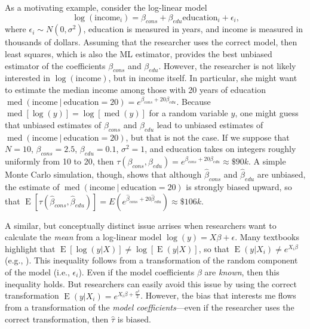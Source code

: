 \documentclass[12pt]{article}
\DeclareMathOperator{\med}{med}
\DeclareMathOperator*{\E}{\text{E}}
\begin{document}
As a motivating example, consider the log-linear model 
\begin{equation}
\log (\text{income}_i) = \beta_{cons} + \beta_{edu} \text{education}_i + \epsilon_i \text{,}\nonumber
\end{equation}
where $\epsilon_i \sim N(0, \sigma^2)$, education is measured in years, and income is measured in thousands of dollars. 
Assuming that the researcher uses the correct model, then least squares, which is also the ML estimator, provides the best unbiased estimator of the coefficients $\beta_{cons}$ and $\beta_{edu}$. 
However, the researcher is not likely interested in $\log(\text{income})$, but in income itself. 
In particular, she might want to estimate the median income among those with 20 years of education $\med(\text{income} ~|~ \text{education} = 20) = e^{\beta_{cons} + 20\beta_{edu}}$. 
Because $\med[\log(y)] = \log[\med(y)]$ for a random variable $y$, one might guess that unbiased estimates of $\beta_{cons}$ and $\beta_{edu}$ lead to unbiased estimates of $\med(\text{income} ~|~ \text{education} = 20)$, but that is not the case. 
If we suppose that $N = 10$, $\beta_{cons} = 2.5$, $\beta_{edu} = 0.1$, $\sigma^2 = 1$, and education takes on integers roughly uniformly from 10 to 20, then $\tau(\beta_{cons}, \beta_{edu}) = e^{\beta_{cons} + 20\beta_{edu}} \approx \$90k$. 
A simple Monte Carlo simulation, though, shows that although $\hat{\beta}_{cons}$ and $\hat{\beta}_{edu}$ are unbiased, the estimate of $\med(\text{income} ~|~ \text{education} = 20)$ is strongly biased upward, so that $\E[\tau(\hat{\beta}_{cons}, \hat{\beta}_{edu})] = E(e^{\hat{\beta}_{cons} + 20\hat{\beta}_{edu}}) \approx \$106k$.

A similar, but conceptually distinct issue arrises when researchers want to calculate the \textit{mean} from a log-linear model $\log(y) = X\beta + \epsilon$. 
Many textbooks highlight that $\E[\log(y|X)] \neq \log[\E(y|X)]$, so that $\E(y | X_i) \neq e^{X_i\beta}$ (e.g., \citealt[pp. 212-215]{Wooldridge2013}). 
This inequality follows from a transformation of the random component of the model (i.e., $\epsilon_i$). 
Even if the model coefficients $\beta$ are \textit{known}, then this inequality holds. 
But researchers can easily avoid this issue by using the correct transformation $\E(y | X_i) = e^{X_i\beta + \frac{\sigma^2}{2}}$. However, the bias that interests me flows from a transformation of the \textit{model coefficients}---even if the researcher uses the correct transformation, then $\hat{\tau}$ is biased. 
\end{document}
